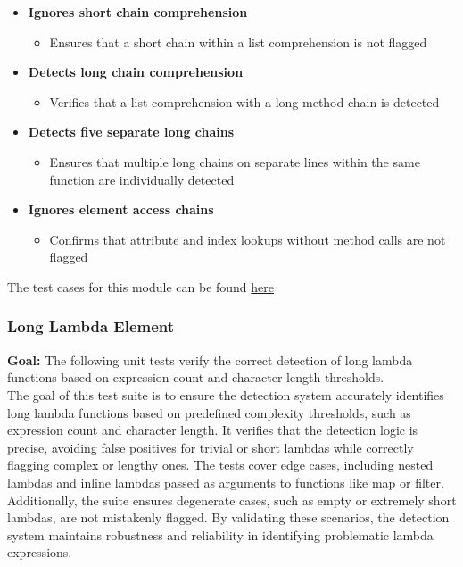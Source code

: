 \documentclass[12pt, titlepage]{article}
\begin{document}
\begin{itemize}
    \item \textbf{Ignores short chain comprehension}
        \begin{itemize}
        \item Ensures that a short chain within a list comprehension is not flagged
        \end{itemize}

    \item \textbf{Detects long chain comprehension}
        \begin{itemize}
        \item Verifies that a list comprehension with a long method chain is detected
        \end{itemize}

    \item \textbf{Detects five separate long chains}
        \begin{itemize}
        \item Ensures that multiple long chains on separate lines within the same function are individually detected
        \end{itemize}

    \item \textbf{Ignores element access chains}
        \begin{itemize}
        \item Confirms that attribute and index lookups without method calls are not flagged
        \end{itemize}
\end{itemize}

  \noindent The test cases for this module can be found
  \href{https://github.com/ssm-lab/capstone--source-code-optimizer/blob/main/tests/analyzers/test_long_message_chain_analyzer.py}{here}

  \subsubsection{Long Lambda Element}

  \textbf{Goal:} The following unit tests verify the correct
  detection of long lambda functions based on expression count and
  character length thresholds.\\

  \noindent The goal of this test suite is to ensure the detection
  system accurately identifies long lambda
  functions based on predefined complexity thresholds, such as
  expression count and character
  length. It verifies that the detection logic is precise, avoiding
  false positives for trivial
  or short lambdas while correctly flagging complex or lengthy ones.
  The tests cover edge cases,
  including nested lambdas and inline lambdas passed as arguments to
  functions like map or
  filter. Additionally, the suite ensures degenerate cases, such as
  empty or extremely short
  lambdas, are not mistakenly flagged. By validating these scenarios,
  the detection system
  maintains robustness and reliability in identifying problematic
  lambda expressions.\\
\end{document}
